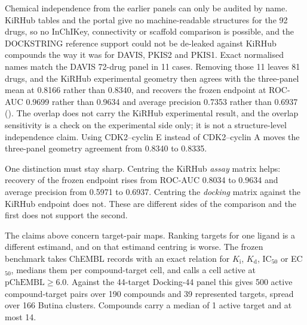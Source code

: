 Chemical independence from the earlier panels can only be audited by name. KiRHub tables and the
portal give no machine-readable structures for the 92 drugs, so no InChIKey, connectivity or
scaffold comparison is possible, and the DOCKSTRING reference support could not be de-leaked
against KiRHub compounds the way it was for DAVIS, PKIS2 and PKIS1. Exact normalised names match
the DAVIS 72-drug panel in 11 cases. Removing those 11 leaves 81 drugs, and the KiRHub
experimental geometry then agrees with the three-panel mean at 0.8166 rather than 0.8340, and
recovers the frozen endpoint at ROC-AUC 0.9699 rather than 0.9634 and average precision 0.7353
rather than 0.6937 ().
The overlap does not carry the KiRHub experimental result, and the overlap sensitivity is a check
on the experimental side only; it is not a structure-level independence claim. Using
CDK2--cyclin E instead of CDK2--cyclin A moves the three-panel geometry agreement from 0.8340 to
0.8335.

One distinction must stay sharp. Centring the KiRHub \emph{assay} matrix helps: recovery of the
frozen endpoint rises from ROC-AUC 0.8034 to 0.9634 and average precision from 0.5971 to 0.6937.
Centring the \emph{docking} matrix against the KiRHub endpoint does not. These are different
sides of the comparison and the first does not support the second.


The claims above concern target-pair maps. Ranking targets for one ligand is a different
estimand, and on that estimand centring is worse. The frozen benchmark takes ChEMBL records with
an exact relation for $K_\mathrm{i}$, $K_\mathrm{d}$, IC$_{50}$ or EC$_{50}$, medians them per
compound-target cell, and calls a cell active at $\mathrm{pChEMBL} \geq 6.0$. Against the
44-target Docking-44 panel this gives 500 active compound-target pairs over 190 compounds and 39
represented targets, spread over 166 Butina clusters. Compounds carry a median of 1 active target
and at most 14.

